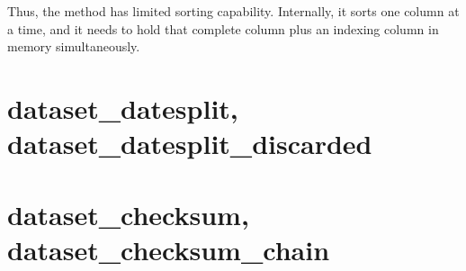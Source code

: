 Thus, the method has limited sorting capability.  Internally, it sorts
one column at a time, and it needs to hold that complete column plus
an indexing column in memory simultaneously.






\clearpage
\section{dataset\_datesplit, dataset\_datesplit\_discarded}

\clearpage
\section{dataset\_checksum, dataset\_checksum\_chain}


